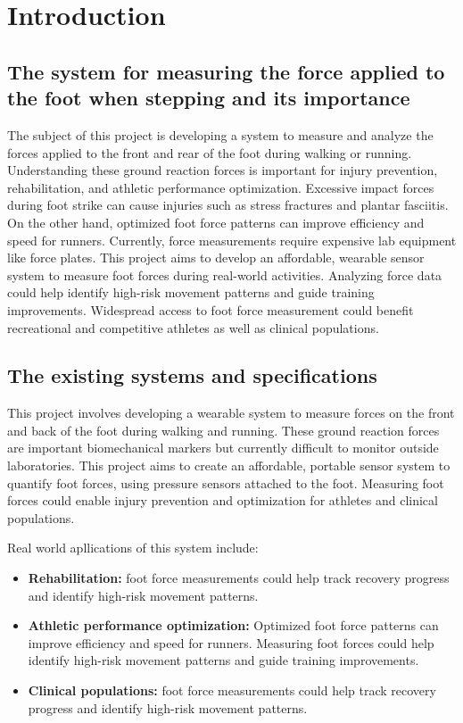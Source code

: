 \section{Introduction} \label{section: introduction}

\subsection{The system for measuring the force applied to the foot when stepping and its importance}
The subject of this project is developing a system to measure and analyze the forces applied to the front and rear of the foot during walking or running. Understanding these ground reaction forces is important for injury prevention, rehabilitation, and athletic performance optimization. Excessive impact forces during foot strike can cause injuries such as stress fractures and plantar fasciitis. On the other hand, optimized foot force patterns can improve efficiency and speed for runners. Currently, force measurements require expensive lab equipment like force plates. This project aims to develop an affordable, wearable sensor system to measure foot forces during real-world activities. Analyzing force data could help identify high-risk movement patterns and guide training improvements. Widespread access to foot force measurement could benefit recreational and competitive athletes as well as clinical populations.

\subsection{The existing systems and specifications}
This project involves developing a wearable system to measure forces on the front and back of the foot during walking and running. These ground reaction forces are important biomechanical markers but currently difficult to monitor outside laboratories. This project aims to create an affordable, portable sensor system to quantify foot forces, using pressure sensors attached to the foot. Measuring foot forces could enable injury prevention and optimization for athletes and clinical populations.

Real world apllications of this system include:
\begin{itemize}
    \item \textbf{Rehabilitation:} foot force measurements could help track recovery progress and identify high-risk movement patterns.
    \item \textbf{Athletic performance optimization:} Optimized foot force patterns can improve efficiency and speed for runners. Measuring foot forces could help identify high-risk movement patterns and guide training improvements.
    \item \textbf{Clinical populations:} foot force measurements could help track recovery progress and identify high-risk movement patterns.
\end{itemize}

